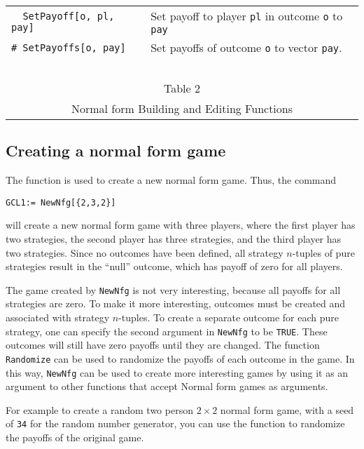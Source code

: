 \begin{table}[htp]
\begin{center}
\begin{tabular} {|l||l|}
\verb+  SetPayoff[o, pl, pay]+ &Set payoff to player \verb+pl+ in outcome \verb+o+ to \verb+pay+\\ 

\verb+# SetPayoffs[o, pay]+ &Set payoffs of outcome \verb+o+ to vector \verb+pay+.  \\ 
\hline
\multicolumn{2}{c}{\ }\\
\multicolumn{2}{c}{Table 2}\\
\multicolumn{2}{c}{Normal form Building and Editing Functions}\\
\end{tabular}
\end{center}
\end{table}
\medskip


\subsection{Creating a normal form game}

The function  is used to create a new normal form game.
Thus, the command

\begin{verbatim}
GCL1:= NewNfg[{2,3,2}]
\end{verbatim}

\noindent 
will create a new normal form game with three players, where the first
player has two strategies, the second player has three strategies, and
the third player has two strategies.  Since no outcomes have been
defined, all strategy $n$-tuples of pure strategies result in the
``null'' outcome, which has payoff of zero for all players.  

The game created by \verb+NewNfg+ is not very interesting, because all
payoffs for all strategies are zero.  To make it more interesting,
outcomes must be created and associated with strategy $n$-tuples.  To
create a separate outcome for each pure strategy, one can specify the
second argument in \verb+NewNfg+ to be \verb+TRUE+.  These outcomes
will still have zero payoffs until they are changed. The function
\verb+Randomize+ can be used to randomize the payoffs of each outcome
in the game.  In this way, \verb+NewNfg+ can be used to create
more interesting games by using it as an argument to other functions
that accept Normal form games as arguments.

For example to create a random two person $2\times 2$ normal form
game, with a seed of \verb+34+ for the random number generator, you can
use the function  to randomize the payoffs of the
original game.


